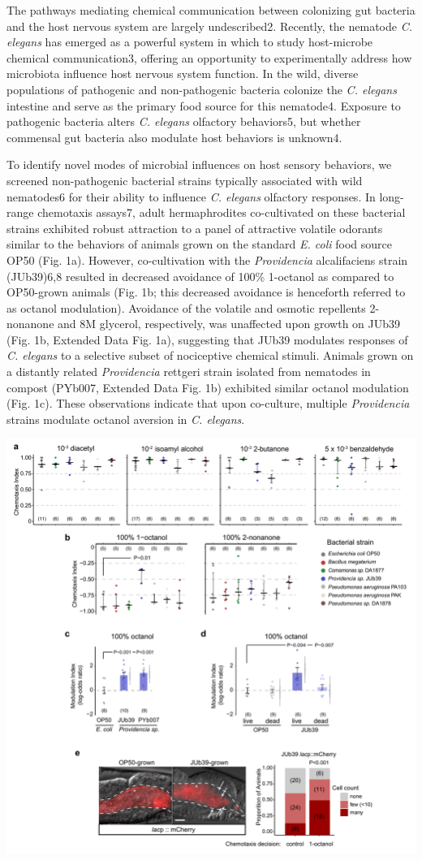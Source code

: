 \documentclass[]{article}
\begin{document}
The pathways mediating chemical communication between colonizing gut
bacteria and the host nervous system are largely undescribed2. Recently,
the nematode \textit{C. elegans} has emerged as a powerful system in
which to study host-microbe chemical communication3, offering an
opportunity to experimentally address how microbiota influence host
nervous system function. In the wild, diverse populations of pathogenic
and non-pathogenic bacteria colonize the \textit{C. elegans} intestine
and serve as the primary food source for this nematode4. Exposure to
pathogenic bacteria alters \textit{C. elegans} olfactory behaviors5, but
whether commensal gut bacteria also modulate host behaviors is unknown4.

To identify novel modes of microbial influences on host sensory
behaviors, we screened non-pathogenic bacterial strains typically
associated with wild nematodes6 for their ability to influence
\textit{C. elegans} olfactory responses. In long-range chemotaxis
assays7, adult hermaphrodites co-cultivated on these bacterial strains
exhibited robust attraction to a panel of attractive volatile odorants
similar to the behaviors of animals grown on the standard
\textit{E. coli} food source OP50 (Fig. 1a). However, co-cultivation
with the \textit{Providencia} alcalifaciens strain (JUb39)6,8 resulted
in decreased avoidance of 100\% 1-octanol as compared to OP50-grown
animals (Fig. 1b; this decreased avoidance is henceforth referred to as
octanol modulation). Avoidance of the volatile and osmotic repellents
2-nonanone and 8M glycerol, respectively, was unaffected upon growth on
JUb39 (Fig. 1b, Extended Data Fig. 1a), suggesting that JUb39 modulates
responses of \textit{C. elegans} to a selective subset of nociceptive
chemical stimuli. Animals grown on a distantly related
\textit{Providencia} rettgeri strain isolated from nematodes in compost
(PYb007, Extended Data Fig. 1b) exhibited similar octanol modulation
(Fig. 1c). These observations indicate that upon co-culture, multiple
\textit{Providencia} strains modulate octanol aversion in
\textit{C. elegans}.

\begin{center}\includegraphics[width=0.75\linewidth]{Figure_1v5} \end{center}
\end{document}
